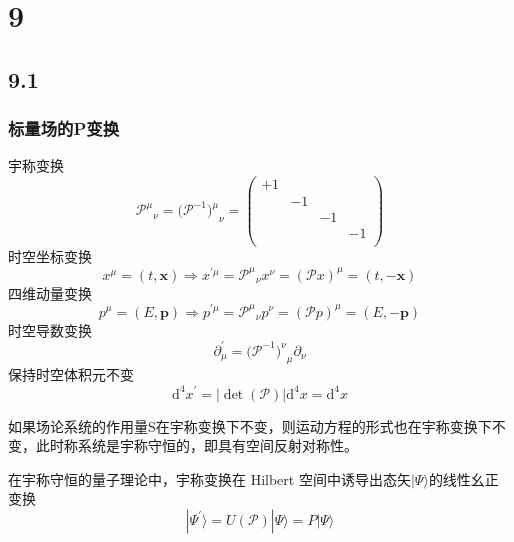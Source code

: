 \section{9}
\subsection{9.1}

\subsubsection{标量场的P变换}
宇称变换
\begin{equation}
    {\mathcal{P} ^{\mu}}_{\nu}=(\mathcal{P} ^{-1}{)^{\mu}}_{\nu}=\left( \begin{matrix}
	+1&		&		&		\\
	&		-1&		&		\\
	&		&		-1&		\\
	&		&		&		-1\\
\end{matrix} \right) 
\end{equation}
时空坐标变换
\begin{equation}
    x^{\mu}=\left( t,\mathbf{x} \right) \Rightarrow x^{\prime \mu}={\mathcal{P} ^{\mu}}_{\nu}x^{\nu}=(\mathcal{P} x)^{\mu}=\left( t,-\mathbf{x} \right) 
\end{equation}
四维动量变换
\begin{equation}
    p^{\mu}=\left( E,\mathbf{p} \right) \Rightarrow p^{\prime \mu}={\mathcal{P} ^{\mu}}_{\nu}p^{\nu}=(\mathcal{P} p)^{\mu}=\left( E,-\mathbf{p} \right) 
\end{equation}
时空导数变换
\begin{equation}
    \partial _{\mu}^{\prime}=(\mathcal{P} ^{-1}{)^{\nu}}_{\mu}\partial _{\nu}
\end{equation}
保持时空体积元不变
\begin{equation}
    \mathrm{d}^4x^{\prime}=\left| \det \left( \mathcal{P} \right) \right|\mathrm{d}^4x=\mathrm{d}^4x
\end{equation}

如果场论系统的作用量S在宇称变换下不变，则运动方程的形式也在宇称变换下不变，此时称系统是宇称守恒的，即具有空间反射对称性。


在宇称守恒的量子理论中，宇称变换在 Hilbert 空间中诱导出态矢$|\Psi \rangle$的线性幺正变换
\begin{equation}
    |\Psi ^{\prime}\rangle =U(\mathcal{P} )|\Psi \rangle =P|\Psi \rangle 
\end{equation}





